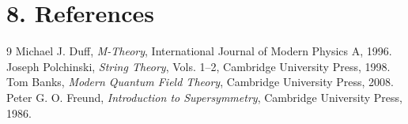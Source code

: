 \section*{8. References}

\begin{thebibliography}{9}
 Michael J. Duff, \emph{M-Theory}, International Journal of Modern Physics A, 1996.
 Joseph Polchinski, \emph{String Theory}, Vols. 1--2, Cambridge University Press, 1998.
 Tom Banks, \emph{Modern Quantum Field Theory}, Cambridge University Press, 2008.
 Peter G. O. Freund, \emph{Introduction to Supersymmetry}, Cambridge University Press, 1986.
\end{thebibliography}